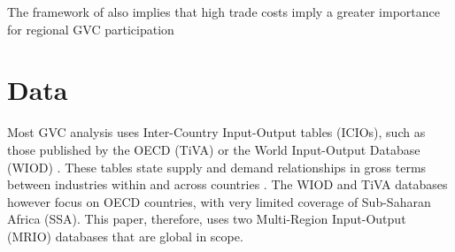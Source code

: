 \documentclass[a4paper]{article}
\begin{document}
The framework of \citet{antras2020geography} also implies that high trade costs imply a greater importance for regional GVC participation

\section{Data}

Most GVC analysis uses Inter-Country Input-Output tables (ICIOs), such as those published by the OECD (TiVA) or the World Input-Output Database (WIOD)  \citep{timmer2012world}. These tables state supply and demand relationships in gross terms between industries within and across countries \citep{Kummritz2014}. The WIOD and TiVA databases however focus on OECD countries, with very limited coverage of Sub-Saharan Africa (SSA). This paper, therefore, uses two Multi-Region Input-Output (MRIO) databases that are global in scope. \newline %
\end{document}
